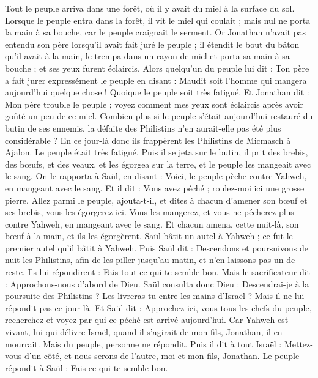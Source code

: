\begin{multicols}{2}
Tout le peuple arriva dans une forêt, où il y avait du miel à la surface du sol.
Lorsque le peuple entra dans la forêt, il vit le miel qui coulait ; mais nul ne porta la main à sa bouche, car le peuple craignait le serment.
Or Jonathan n'avait pas entendu son père lorsqu'il avait fait juré le peuple ; il étendit le bout du bâton qu'il avait à la main, le trempa dans un rayon de miel et porta sa main à sa bouche ; et ses yeux furent éclaircis.
Alors quelqu'un du peuple lui dit : Ton père a fait jurer expressément le peuple en disant : Maudit soit l'homme qui mangera aujourd'hui quelque chose ! Quoique le peuple soit très fatigué.
Et Jonathan dit : Mon père trouble le peuple ; voyez comment mes yeux sont éclaircis après avoir goûté un peu de ce miel.
Combien plus si le peuple s'était aujourd'hui restauré du butin de ses ennemis, la défaite des Philistins n'en aurait-elle pas été plus considérable ?
En ce jour-là donc ils frappèrent les Philistins de Micmasch à Ajalon. Le peuple était très fatigué.
Puis il se jeta sur le butin, il prit des brebis, des bœufs, et des veaux, et les égorgea sur la terre, et le peuple les mangeait avec le sang.
On le rapporta à Saül, en disant : Voici, le peuple pèche contre Yahweh, en mangeant avec le sang. Et il dit : Vous avez péché ; roulez-moi ici une grosse pierre.
Allez parmi le peuple, ajouta-t-il, et dites à chacun d'amener son bœuf et ses brebis, vous les égorgerez ici. Vous les mangerez, et vous ne pécherez plus contre Yahweh, en mangeant avec le sang. Et chacun amena, cette nuit-là, son bœuf à la main, et ils les égorgèrent.
Saül bâtit un autel à Yahweh ; ce fut le premier autel qu'il bâtit à Yahweh.
Puis Saül dit : Descendons et poursuivons de nuit les Philistins, afin de les piller jusqu'au matin, et n'en laissons pas un de reste. Ils lui répondirent : Fais tout ce qui te semble bon. Mais le sacrificateur dit : Approchons-nous d'abord de Dieu.
Saül consulta donc Dieu : Descendrai-je à la poursuite des Philistins ? Les livreras-tu entre les mains d'Israël ? Mais il ne lui répondit pas ce jour-là.
Et Saül dit : Approchez ici, vous tous les chefs du peuple, recherchez et voyez par qui ce péché est arrivé aujourd'hui.
Car Yahweh est vivant, lui qui délivre Israël, quand il s'agirait de mon fils, Jonathan, il en mourrait. Mais du peuple, personne ne répondit.
Puis il dit à tout Israël : Mettez-vous d'un côté, et nous serons de l'autre, moi et mon fils, Jonathan. Le peuple répondit à Saül : Fais ce qui te semble bon.

\end{multicols}
